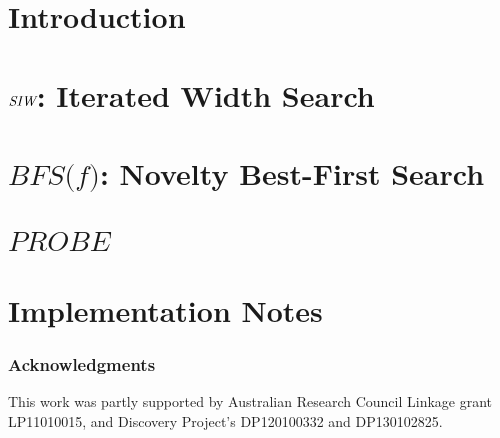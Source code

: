 \documentclass[letterpaper]{article}
\begin{document}
\section{Introduction}


\section{${\textit{SIW}}$: Iterated Width Search}


\section{$\textit{BFS(f)}$: Novelty Best-First Search}


\section{$\textit{PROBE}$}


\section{Implementation Notes}





\subsubsection{Acknowledgments}
This work was partly supported by Australian Research Council Linkage grant LP11010015, and Discovery Project's DP120100332 and DP130102825.




\end{document}

